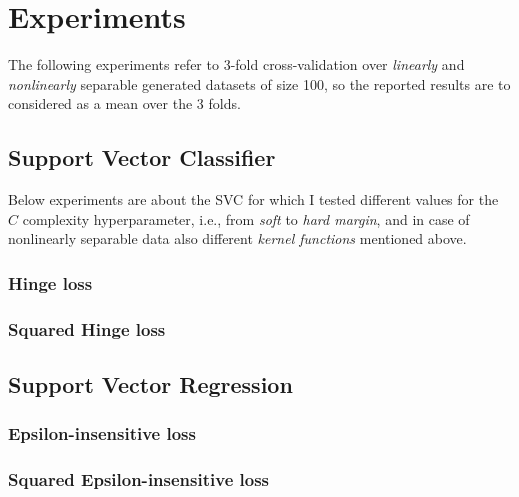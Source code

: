 \section{Experiments}

The following experiments refer to 3-fold cross-validation over \emph{linearly} and \emph{nonlinearly} separable generated datasets of size 100, so the reported results are to considered as a mean over the 3 folds.

\subsection{Support Vector Classifier}

Below experiments are about the SVC for which I tested different values for the $C$ complexity hyperparameter, i.e., from \emph{soft} to \emph{hard margin}, and in case of nonlinearly separable data also different \emph{kernel functions} mentioned above.

\subsubsection{Hinge loss}











\subsubsection{Squared Hinge loss}




\subsection{Support Vector Regression}

\subsubsection{Epsilon-insensitive loss}











\subsubsection{Squared Epsilon-insensitive loss}



